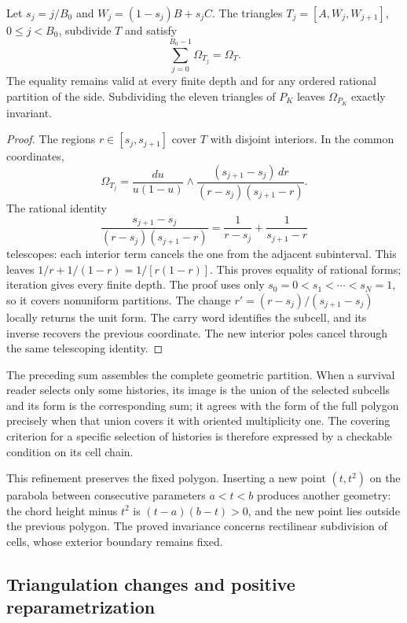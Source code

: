\begin{theorem}
\label{thm:polygon-carry}
Let \(s_j=j/B_0\) and \(W_j=(1-s_j)B+s_jC\).
The triangles \(T_j=[A,W_j,W_{j+1}]\), \(0\leq j<B_0\),
subdivide \(T\) and satisfy
\begin{equation}
 \sum_{j=0}^{B_0-1}\Omega_{T_j}=\Omega_T.
 \label{eq:polygon-carry-additivity}
\end{equation}
The equality remains valid at every finite depth and for any ordered
rational partition of the side. Subdividing the eleven triangles
of \(P_K\) leaves \(\Omega_{P_K}\) exactly invariant.
\end{theorem}
\begin{proof}
The regions \(r\in[s_j,s_{j+1}]\) cover \(T\) with disjoint
interiors. In the common coordinates,
\[
 \Omega_{T_j}=\frac{du}{u(1-u)}\wedge
 \frac{(s_{j+1}-s_j)\,dr}{(r-s_j)(s_{j+1}-r)}.
\]
The rational identity
\[
 \frac{s_{j+1}-s_j}{(r-s_j)(s_{j+1}-r)}
 =\frac1{r-s_j}+\frac1{s_{j+1}-r}
\]
telescopes: each interior term cancels the one from the adjacent
subinterval. This leaves \(1/r+1/(1-r)=1/[r(1-r)]\).
This proves equality of rational forms; iteration gives every finite
depth. The proof uses only \(s_0=0<s_1<\cdots<s_N=1\), so it
covers nonuniform partitions. The change
\(r'=(r-s_j)/(s_{j+1}-s_j)\) locally returns the unit form.
The carry word identifies the subcell, and its inverse recovers
the previous coordinate. The new interior poles cancel through the
same telescoping identity.
\end{proof}

The preceding sum assembles the complete geometric partition. When a
survival reader selects only some histories, its image is the union
of the selected subcells and its form is the corresponding sum;
it agrees with the form of the full polygon precisely when that union
covers it with oriented multiplicity one. The covering criterion for
a specific selection of histories is therefore expressed by a
checkable condition on its cell chain.

This refinement preserves the fixed polygon. Inserting a new point
\((t,t^2)\) on the parabola between consecutive parameters
\(a<t<b\) produces another geometry: the chord height minus
\(t^2\) is \((t-a)(b-t)>0\), and the new point lies outside
the previous polygon. The proved invariance concerns rectilinear
subdivision of cells, whose exterior boundary remains fixed.

\subsection{Triangulation changes and positive reparametrization}

